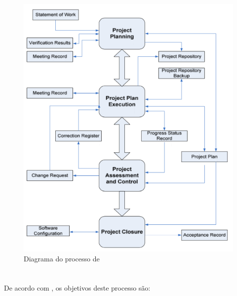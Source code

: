 \begin{figure}[!h]
\centering
\includegraphics[scale=0.5]{figuras/gp_diagr.png}
\caption{Diagrama do processo de \gp \cite[pág. 12]{iso}}
\label{fig:gp:diagr}
\end{figure}

\section{\dsw}
\label{Sec:iso:obj:dsw}

De acordo com \cite{iso}, os objetivos deste processo são:

